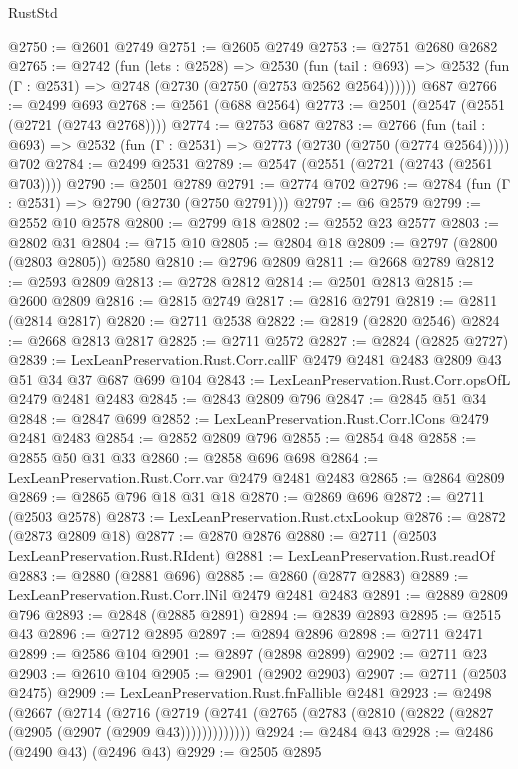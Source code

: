 \begin{lexlean}{RustStd}
\begin{coremodule}
@2750 := @2601 @2749
@2751 := @2605 @2749
@2753 := @2751 @2680 @2682
@2765 := @2742
    (fun (lets : @2528) =>
    @2530
      (fun (tail : @693) => @2532 (fun (Γ : @2531) => @2748 (@2730 (@2750 (@2753 @2562 @2564))))))
    @687
@2766 := @2499 @693
@2768 := @2561 (@688 @2564)
@2773 := @2501 (@2547 (@2551 (@2721 (@2743 @2768))))
@2774 := @2753 @687
@2783 := @2766
    (fun (tail : @693) => @2532 (fun (Γ : @2531) => @2773 (@2730 (@2750 (@2774 @2564)))))
    @702
@2784 := @2499 @2531
@2789 := @2547 (@2551 (@2721 (@2743 (@2561 @703))))
@2790 := @2501 @2789
@2791 := @2774 @702
@2796 := @2784 (fun (Γ : @2531) => @2790 (@2730 (@2750 @2791)))
@2797 := @6 @2579
@2799 := @2552 @10 @2578
@2800 := @2799 @18
@2802 := @2552 @23 @2577
@2803 := @2802 @31
@2804 := @715 @10
@2805 := @2804 @18
@2809 := @2797 (@2800 (@2803 @2805)) @2580
@2810 := @2796 @2809
@2811 := @2668 @2789
@2812 := @2593 @2809
@2813 := @2728 @2812
@2814 := @2501 @2813
@2815 := @2600 @2809
@2816 := @2815 @2749
@2817 := @2816 @2791
@2819 := @2811 (@2814 @2817)
@2820 := @2711 @2538
@2822 := @2819 (@2820 @2546)
@2824 := @2668 @2813 @2817
@2825 := @2711 @2572
@2827 := @2824 (@2825 @2727)
@2839 := LexLeanPreservation.Rust.Corr.callF @2479 @2481 @2483 @2809 @43 @51 @34 @37 @687 @699 @104
@2843 := LexLeanPreservation.Rust.Corr.opsOfL @2479 @2481 @2483
@2845 := @2843 @2809 @796
@2847 := @2845 @51 @34
@2848 := @2847 @699
@2852 := LexLeanPreservation.Rust.Corr.lCons @2479 @2481 @2483
@2854 := @2852 @2809 @796
@2855 := @2854 @48
@2858 := @2855 @50 @31 @33
@2860 := @2858 @696 @698
@2864 := LexLeanPreservation.Rust.Corr.var @2479 @2481 @2483
@2865 := @2864 @2809
@2869 := @2865 @796 @18 @31 @18
@2870 := @2869 @696
@2872 := @2711 (@2503 @2578)
@2873 := LexLeanPreservation.Rust.ctxLookup
@2876 := @2872 (@2873 @2809 @18)
@2877 := @2870 @2876
@2880 := @2711 (@2503 LexLeanPreservation.Rust.RIdent)
@2881 := LexLeanPreservation.Rust.readOf
@2883 := @2880 (@2881 @696)
@2885 := @2860 (@2877 @2883)
@2889 := LexLeanPreservation.Rust.Corr.lNil @2479 @2481 @2483
@2891 := @2889 @2809 @796
@2893 := @2848 (@2885 @2891)
@2894 := @2839 @2893
@2895 := @2515 @43
@2896 := @2712 @2895
@2897 := @2894 @2896
@2898 := @2711 @2471
@2899 := @2586 @104
@2901 := @2897 (@2898 @2899)
@2902 := @2711 @23
@2903 := @2610 @104
@2905 := @2901 (@2902 @2903)
@2907 := @2711 (@2503 @2475)
@2909 := LexLeanPreservation.Rust.fnFallible @2481
@2923 := @2498
    (@2667
      (@2714
        (@2716
          (@2719 (@2741 (@2765 (@2783 (@2810 (@2822 (@2827 (@2905 (@2907 (@2909 @43)))))))))))))
@2924 := @2484 @43
@2928 := @2486 (@2490 @43) (@2496 @43)
@2929 := @2505 @2895

\end{coremodule}
\end{lexlean}
